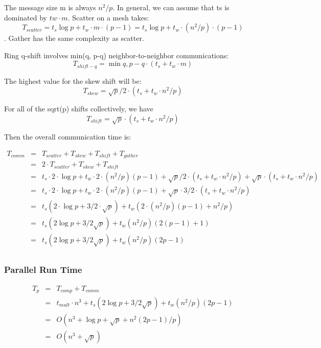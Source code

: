 \documentclass{article}
\begin{document}
The message size m is always $n^2/p$. In general, we can assume that ts is
dominated by $tw \cdot m$. Scatter on a mesh takes: $$T_{{scatter}} = t_s
\log{p} + t_w \cdot m  \cdot (p-1) = t_s \log{p} + t_w \cdot (n^2/p) \cdot
(p-1)$$. Gather has the same complexity as scatter.

Ring q-shift involves min(q, p-q) neighbor-to-neighbor communications:
$$T_{{shift-q}} = \min{q,p-q} \cdot (t_s + t_w \cdot m)$$

The highest value for the skew shift will be:
$$T_{{skew}} = \sqrt{p}/2 \cdot (t_s + t_w \cdot n^2/p)$$

For all of the sqrt(p) shifts collectively, we have
$$T_{{shift}} = \sqrt{p} \cdot (t_s + t_w \cdot n^2/p)$$

Then the overall communication time is:


\begin{eqnarray*}
T_{{comm}} 	&=& T_{{scatter}} + T_{{skew}} + T_{{shift}} + T_{{gather}} \\
			&=& 2 \cdot T_{{scatter}} + T_{{skew}} + T_{{shift}}  \\
			&=& t_s \cdot 2 \cdot \log{p} + t_w \cdot 2 \cdot (n^2/p)(p-1) + \sqrt{p}/2 \cdot (t_s + t_w \cdot n^2/p) + \sqrt{p} \cdot (t_s + t_w \cdot n^2/p) \\ 
			&=& t_s \cdot 2 \cdot \log{p} + t_w \cdot 2 \cdot (n^2/p)(p-1) + \sqrt{p} \cdot 3/2 \cdot (t_s + t_w \cdot n^2/p) \\ 
			&=& t_s(2 \cdot \log{p} + 3/2 \cdot \sqrt{p}) + t_w (2 \cdot (n^2/p)(p-1) + n^2/p) \\ 
			&=& t_s (2 \log{p} + 3/2 \sqrt{p}) + t_w (n^2/p)(2(p-1) + 1) \\
			&=& t_s (2 \log{p} + 3/2 \sqrt{p}) + t_w (n^2/p)(2p-1) \\
\end{eqnarray*}



\subsubsection{Parallel Run Time}

\begin{eqnarray*}
T_p 	&=& T_{{comp}} + T_{{comm}} \\
		&=& t_{{mult}} \cdot n^3 + t_s (2 \log{p} + 3/2 \sqrt{p}) + t_w (n^2/p)(2p-1) \\
		&=& O(n^3 + \log{p} + \sqrt{p} + n^2 (2p-1)/p) \\
		&=& O(n^3 + \sqrt{p}) \\
\end{eqnarray*}
\end{document}
